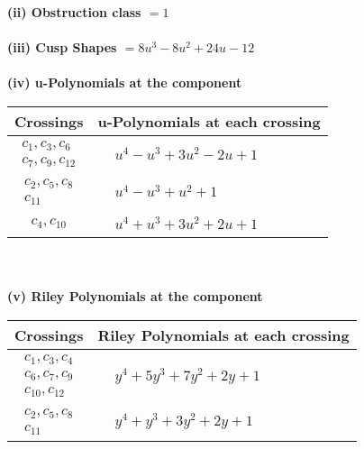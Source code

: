 \documentclass[1p]{elsarticle_modified}
\theoremstyle{definition}
\begin{document}
\flushleft \textbf{(ii) Obstruction class $= 1$}\\~\\
\flushleft \textbf{(iii) Cusp Shapes $= 8 u^3-8 u^2+24 u-12$}\\~\\
\newpage\renewcommand{\arraystretch}{1}
\flushleft \textbf{(iv) u-Polynomials at the component}\newline \\
\begin{tabular}{m{50pt}|m{274pt}}
Crossings & \hspace{64pt}u-Polynomials at each crossing \\
\hline $$\begin{aligned}c_{1},c_{3},c_{6}\\c_{7},c_{9},c_{12}\end{aligned}$$&$\begin{aligned}
&u^4- u^3+3 u^2-2 u+1
\end{aligned}$\\
\hline $$\begin{aligned}c_{2},c_{5},c_{8}\\c_{11}\end{aligned}$$&$\begin{aligned}
&u^4- u^3+u^2+1
\end{aligned}$\\
\hline $$\begin{aligned}c_{4},c_{10}\end{aligned}$$&$\begin{aligned}
&u^4+u^3+3 u^2+2 u+1
\end{aligned}$\\
\hline
\end{tabular}\\~\\
\newpage\renewcommand{\arraystretch}{1}
\flushleft \textbf{(v) Riley Polynomials at the component}\newline \\
\begin{tabular}{m{50pt}|m{274pt}}
Crossings & \hspace{64pt}Riley Polynomials at each crossing \\
\hline $$\begin{aligned}c_{1},c_{3},c_{4}\\c_{6},c_{7},c_{9}\\c_{10},c_{12}\end{aligned}$$&$\begin{aligned}
&y^4+5 y^3+7 y^2+2 y+1
\end{aligned}$\\
\hline $$\begin{aligned}c_{2},c_{5},c_{8}\\c_{11}\end{aligned}$$&$\begin{aligned}
&y^4+y^3+3 y^2+2 y+1
\end{aligned}$\\
\hline
\end{tabular}\\~\\
\end{document}
